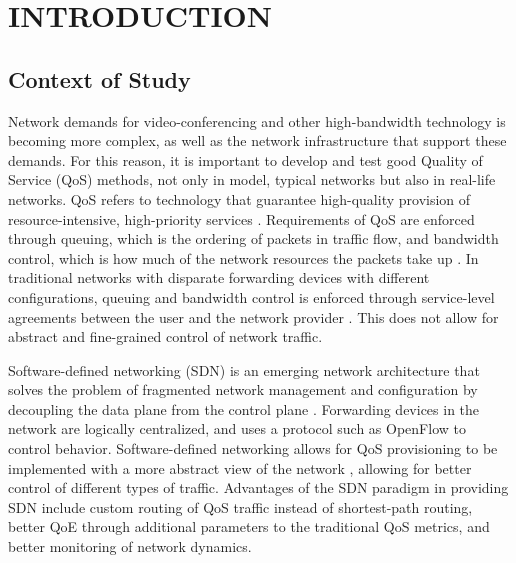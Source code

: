 \chapter{INTRODUCTION}

\section{Context of Study}

Network demands for video-conferencing and other high-bandwidth technology is becoming more complex, as well as the network infrastructure that support these demands. For this reason, it is important to develop and test good Quality of Service (QoS) methods, not only in model, typical networks but also in real-life networks. QoS refers to technology that guarantee high-quality provision of resource-intensive, high-priority services \cite{noauthor_what_nodate}. Requirements of QoS are enforced through queuing, which is the ordering of packets in traffic flow, and bandwidth control, which is how much of the network resources the packets take up \cite{zhao_internet_2000}. In traditional networks with disparate forwarding devices with different configurations, queuing and bandwidth control is enforced through service-level agreements between the user and the network provider \cite{karakus_quality_2017}. This does not allow for abstract and fine-grained control of network traffic.

Software-defined networking (SDN) is an emerging network architecture that solves the problem of fragmented network management and configuration by decoupling the data plane from the control plane \cite{kreutz_software-defined_2015}. Forwarding devices in the network are logically centralized, and uses a protocol such as OpenFlow to control behavior. Software-defined networking allows for QoS provisioning to be implemented with a more abstract view of the network , allowing for better control of different types of traffic. Advantages of the SDN paradigm in providing SDN include custom routing of QoS traffic instead of shortest-path routing, better QoE through additional parameters to the traditional QoS metrics, and better monitoring of network dynamics.

